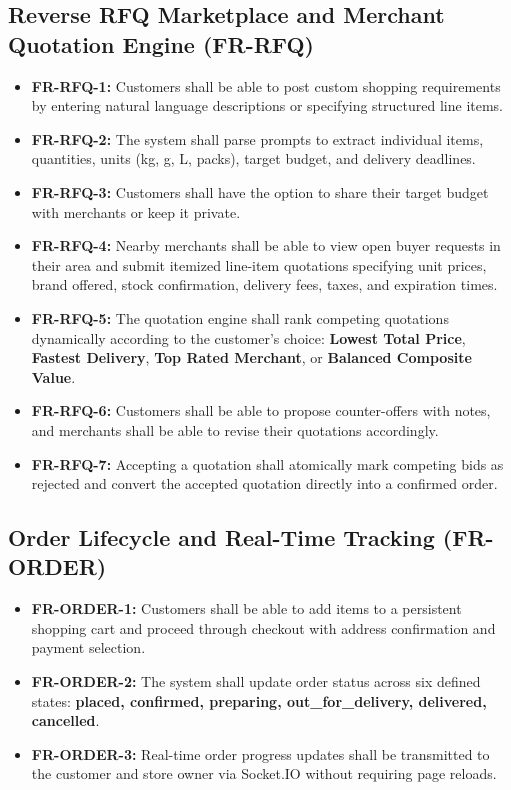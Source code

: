\subsection{Reverse RFQ Marketplace and Merchant Quotation Engine (FR-RFQ)}
\begin{itemize}
    \item \textbf{FR-RFQ-1:} Customers shall be able to post custom shopping requirements by entering natural language descriptions or specifying structured line items.
    \item \textbf{FR-RFQ-2:} The system shall parse prompts to extract individual items, quantities, units (kg, g, L, packs), target budget, and delivery deadlines.
    \item \textbf{FR-RFQ-3:} Customers shall have the option to share their target budget with merchants or keep it private.
    \item \textbf{FR-RFQ-4:} Nearby merchants shall be able to view open buyer requests in their area and submit itemized line-item quotations specifying unit prices, brand offered, stock confirmation, delivery fees, taxes, and expiration times.
    \item \textbf{FR-RFQ-5:} The quotation engine shall rank competing quotations dynamically according to the customer's choice: \textbf{Lowest Total Price}, \textbf{Fastest Delivery}, \textbf{Top Rated Merchant}, or \textbf{Balanced Composite Value}.
    \item \textbf{FR-RFQ-6:} Customers shall be able to propose counter-offers with notes, and merchants shall be able to revise their quotations accordingly.
    \item \textbf{FR-RFQ-7:} Accepting a quotation shall atomically mark competing bids as rejected and convert the accepted quotation directly into a confirmed order.
\end{itemize}

\subsection{Order Lifecycle and Real-Time Tracking (FR-ORDER)}
\begin{itemize}
    \item \textbf{FR-ORDER-1:} Customers shall be able to add items to a persistent shopping cart and proceed through checkout with address confirmation and payment selection.
    \item \textbf{FR-ORDER-2:} The system shall update order status across six defined states: \textbf{placed, confirmed, preparing, out\_for\_delivery, delivered, cancelled}.
    \item \textbf{FR-ORDER-3:} Real-time order progress updates shall be transmitted to the customer and store owner via Socket.IO without requiring page reloads.
\end{itemize}

